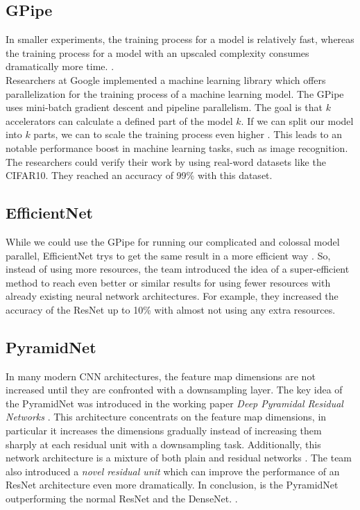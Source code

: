 \documentclass[journal]{IEEEtran}
\begin{document}
\subsection{GPipe}
In smaller experiments, the training process for a model is relatively fast, whereas the training process for a model with an upscaled complexity consumes dramatically more time.
\cite{Yao2017ComplexityVP}.\\
Researchers at Google implemented a machine learning library which offers parallelization for the training process of a machine learning model. The GPipe uses mini-batch gradient descent and pipeline parallelism. The goal is that \(k\) accelerators can calculate a defined part of the model \(k\). If we can split our model into \(k\)  parts, we can to scale the training process even higher \cite{GPipe}. This leads to an notable performance boost in machine learning tasks, such as image recognition\cite{perfGPipe}. The researchers could verify their work by using real-word datasets like the CIFAR10. They reached an accuracy of 99\% \cite{GPipe} with this dataset. 
\subsection{EfficientNet}
While we could use the GPipe for running our complicated and colossal model parallel, EfficientNet trys to get the same result in a more efficient way\cite{EfficientNet} . So, instead of using more resources, the team introduced the idea of a super-efficient method to reach even better or similar results for using fewer resources with already existing neural network architectures\cite{EfficientNet}. For example, they increased the accuracy of the ResNet up to 10\% with almost not using any extra resources.
\subsection{PyramidNet}
In many modern CNN architectures, the feature map dimensions are not increased until they are confronted with a downsampling layer.
The key idea of the PyramidNet was introduced in the working paper \textit{Deep Pyramidal Residual Networks} \cite{lim2019fast}. This architecture concentrats on the feature
map dimensions, in particular it increases the dimensions gradually instead of increasing them sharply at each residual unit with a downsampling task. Additionally, this network architecture is a mixture of both plain and residual networks \cite{lim2019fast}. The team also introduced a \textit{novel residual unit} which can improve the performance of an ResNet architecture even more dramatically. 
In conclusion, is the PyramidNet outperforming the normal ResNet and the DenseNet. \cite{lim2019fast}.
%
%
\end{document}
